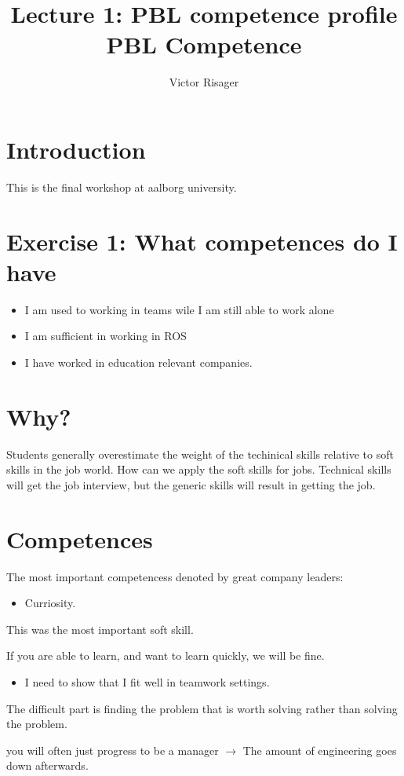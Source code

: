 \documentclass[a4paper]{article}
\title{Lecture 1: PBL competence profile  \\
	\large PBL Competence}
\author{Victor Risager}
\begin{document}
\maketitle

\section{Introduction}
This is the final workshop at aalborg university.

\section{Exercise 1: What competences do I have}
\begin{itemize}
	\item I am used to working in teams wile I am still able to work alone 
	\item I am sufficient in working in ROS 
	\item I have worked in education relevant companies. 
\end{itemize}

\section{Why?}
Students generally overestimate the weight of the techinical skills relative to soft skills in the job world. 
How can we apply the soft skills for jobs.
Technical skills will get the job interview, but the generic skills will result in getting the job.


\section{Competences}
The most important competencess denoted by great company leaders:
\begin{itemize}
	\item Curriosity.
\end{itemize}
This was the most important soft skill.

If you are able to learn, and want to learn quickly, we will be fine. 


\begin{itemize}
	\item I need to show that I fit well in teamwork settings. 
\end{itemize}
The difficult part is finding the problem that is worth solving rather than solving the problem. 

\vspace{5pt}
you will often just progress to be a manager $ \rightarrow $ The amount of engineering goes down afterwards. 
\end{document}

